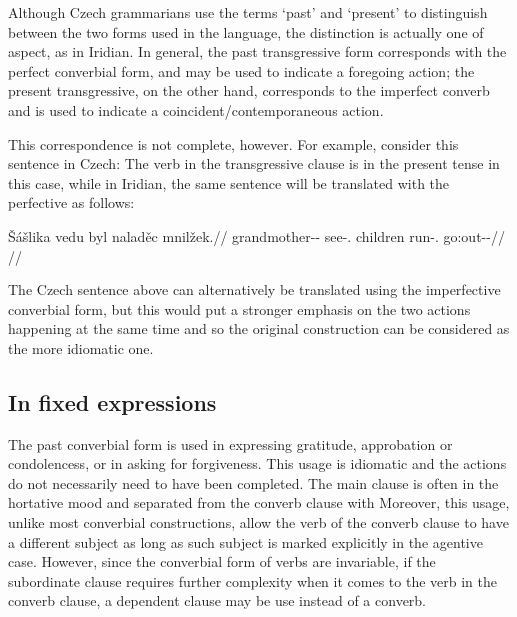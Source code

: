 Although Czech grammarians use the terms `past' and `present' to distinguish
between the two forms used in the language, the distinction is actually one of
aspect, as in Iridian. In general, the past transgressive form
corresponds with the perfect converbial form, and may be used to indicate a
foregoing action; the present transgressive, on the other hand, corresponds to
the imperfect converb and is used to indicate a coincident/contemporaneous
action.

This correspondence is not complete, however. For example, consider this
sentence in Czech:  The verb in the
transgressive clause is in the present tense in this case, while in Iridian, the
same sentence will be translated with the perfective as follows:

\pex
\begingl
\gla Šášlika vedu byl naladěc mnilžek.//
\glb grandmother-\Dim{}-\Acc{} see-\Cv{}.\Pf{} children run-\Cv{}.\Ipf{} go:out-\Av{}-\Pf{}//
\glft {}//
\endgl
\xe

The Czech sentence above can alternatively be translated using the
imperfective converbial form, but this would put a stronger emphasis on the two
actions happening at the same time and so the original construction can be
considered as the more idiomatic one.

\subsection{In fixed expressions}

The past converbial form is used in expressing gratitude, approbation or
condolencess, or in asking for forgiveness. This usage is idiomatic and the
actions do not necessarily need to have been completed. The main clause is often
in the hortative mood and separated from the converb
clause with  Moreover, this usage, unlike most converbial
constructions, allow the verb of the converb clause to have a different subject
as long as such subject is marked explicitly in the agentive case. However,
since the converbial form of verbs are invariable, if the subordinate clause
requires further complexity when it comes to the verb in the converb clause, a
dependent  clause may be use instead of a converb.

